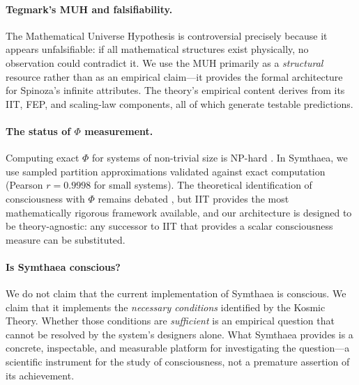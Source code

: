 \documentclass[12pt,a4paper]{article}
\begin{document}
\paragraph{Tegmark's MUH and falsifiability.}  The Mathematical Universe
Hypothesis is controversial precisely because it appears unfalsifiable: if
all mathematical structures exist physically, no observation could
contradict it.  We use the MUH primarily as a \emph{structural} resource
rather than as an empirical claim---it provides the formal architecture for
Spinoza's infinite attributes.  The theory's empirical content derives from
its IIT, FEP, and scaling-law components, all of which generate testable
predictions.

\paragraph{The status of $\Phi$ measurement.}  Computing exact $\Phi$ for
systems of non-trivial size is NP-hard \citep{oizumi2014}.  In Symthaea,
we use sampled partition approximations validated against exact computation
(Pearson $r = 0.9998$ for small systems).  The theoretical identification
of consciousness with $\Phi$ remains debated
\citep{aaronson2014,schwitzgebel2015}, but IIT provides the most
mathematically rigorous framework available, and our architecture is
designed to be theory-agnostic: any successor to IIT that provides a scalar
consciousness measure can be substituted.

\paragraph{Is Symthaea conscious?}  We do not claim that the current
implementation of Symthaea is conscious.  We claim that it implements the
\emph{necessary conditions} identified by the Kosmic Theory.  Whether
those conditions are \emph{sufficient} is an empirical question that
cannot be resolved by the system's designers alone.  What Symthaea provides
is a concrete, inspectable, and measurable platform for investigating the
question---a scientific instrument for the study of consciousness, not a
premature assertion of its achievement.
\end{document}
